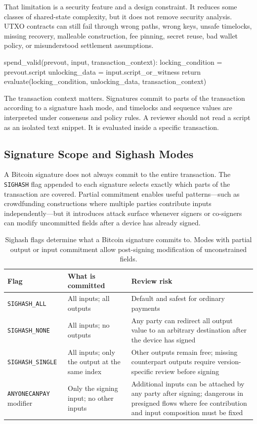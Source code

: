 That limitation is a security feature and a design constraint. It reduces some classes of shared-state complexity, but it does not remove security analysis. UTXO contracts can still fail through wrong paths, wrong keys, unsafe timelocks, missing recovery, malleable construction, fee pinning, secret reuse, bad wallet policy, or misunderstood settlement assumptions.

\begin{codeblock}
spend_valid(prevout, input, transaction_context):
    locking_condition = prevout.script
    unlocking_data = input.script_or_witness
    return evaluate(locking_condition, unlocking_data, transaction_context)
\end{codeblock}

The transaction context matters. Signatures commit to parts of the transaction according to a signature hash mode, and timelocks and sequence values are interpreted under consensus and policy rules. A reviewer should not read a script as an isolated text snippet. It is evaluated inside a specific transaction.

\subsection{Signature Scope and Sighash Modes}

A Bitcoin signature does not always commit to the entire transaction. The \texttt{SIGHASH} flag appended to each signature selects exactly which parts of the transaction are covered. Partial commitment enables useful patterns---such as crowdfunding constructions where multiple parties contribute inputs independently---but it introduces attack surface whenever signers or co-signers can modify uncommitted fields after a device has already signed.

\begin{table}[htbp]
\centering
\small
\renewcommand{\arraystretch}{1.18}
\begin{tabularx}{\textwidth}{@{}>{\RaggedRight\arraybackslash}p{}>{\RaggedRight\arraybackslash}p{}X@{}}
\toprule
Flag & What is committed & Review risk \\
\midrule
\texttt{SIGHASH\_ALL} & All inputs; all outputs & Default and safest for ordinary payments \\
\texttt{SIGHASH\_NONE} & All inputs; no outputs & Any party can redirect all output value to an arbitrary destination after the device has signed \\
\texttt{SIGHASH\_SINGLE} & All inputs; only the output at the same index & Other outputs remain free; missing counterpart outputs require version-specific review before signing \\
\texttt{ANYONECANPAY} modifier & Only the signing input; no other inputs & Additional inputs can be attached by any party after signing; dangerous in presigned flows where fee contribution and input composition must be fixed \\
\bottomrule
\end{tabularx}
\caption{Sighash flags determine what a Bitcoin signature commits to. Modes with partial output or input commitment allow post-signing modification of unconstrained fields.}
\end{table}

